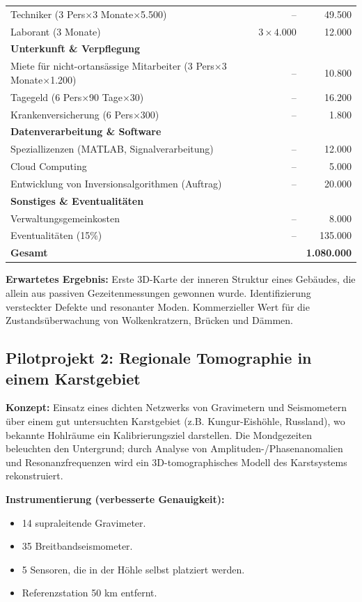 \documentclass[12pt,a4paper]{article}
\theoremstyle{remark}
\begin{document}
\begin{table}[htbp]
\begin{tabular}{lrr}
			Techniker (3 Pers$\times$3 Monate$\times$5.500) & – & 49.500 \\
			Laborant (3 Monate) & $3\times4.000$ & 12.000 \\
			\multicolumn{3}{l}{\textbf{Unterkunft \& Verpflegung}} \\
			Miete für nicht-ortansässige Mitarbeiter (3 Pers$\times$3 Monate$\times$1.200) & – & 10.800 \\
			Tagegeld (6 Pers$\times$90 Tage$\times$30) & – & 16.200 \\
			Krankenversicherung (6 Pers$\times$300) & – & 1.800 \\
			\multicolumn{3}{l}{\textbf{Datenverarbeitung \& Software}} \\
			Speziallizenzen (MATLAB, Signalverarbeitung) & – & 12.000 \\
			Cloud Computing & – & 5.000 \\
			Entwicklung von Inversionsalgorithmen (Auftrag) & – & 20.000 \\
			\multicolumn{3}{l}{\textbf{Sonstiges \& Eventualitäten}} \\
			Verwaltungsgemeinkosten & – & 8.000 \\
			Eventualitäten (15\%) & – & 135.000 \\
			\midrule
			\textbf{Gesamt} & & \textbf{1.080.000} \\
			\bottomrule
		\end{tabular}
	\end{table}
	
	\textbf{Erwartetes Ergebnis:} Erste 3D-Karte der inneren Struktur eines Gebäudes, die allein aus passiven Gezeitenmessungen gewonnen wurde. Identifizierung versteckter Defekte und resonanter Moden. Kommerzieller Wert für die Zustandsüberwachung von Wolkenkratzern, Brücken und Dämmen.
	
	\subsection{Pilotprojekt 2: Regionale Tomographie in einem Karstgebiet}
	
	\textbf{Konzept:} Einsatz eines dichten Netzwerks von Gravimetern und Seismometern über einem gut untersuchten Karstgebiet (z.B. Kungur-Eishöhle, Russland), wo bekannte Hohlräume ein Kalibrierungsziel darstellen. Die Mondgezeiten beleuchten den Untergrund; durch Analyse von Amplituden-/Phasenanomalien und Resonanzfrequenzen wird ein 3D-tomographisches Modell des Karstsystems rekonstruiert.
	
	\textbf{Instrumentierung (verbesserte Genauigkeit):}
	\begin{itemize}
		\item 14 supraleitende Gravimeter.
		\item 35 Breitbandseismometer.
		\item 5 Sensoren, die in der Höhle selbst platziert werden.
		\item Referenzstation 50 km entfernt.
	\end{itemize}
	
\end{document}
